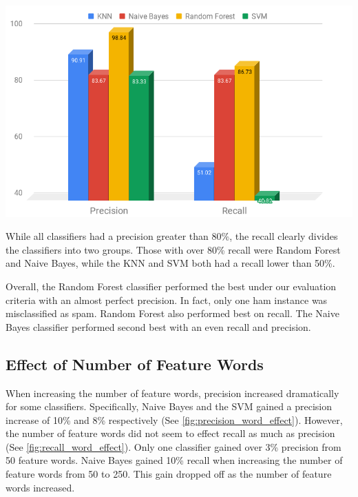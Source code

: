 \documentclass[12pt]{article}
\newenvironment{Figure}
  {\par\medskip\noindent\minipage{\linewidth}}
  {\endminipage\par\medskip}
\begin{document}
\begin{multicols}{2}
                \begin{Figure}
                    \centering
                    \includegraphics[width=\linewidth]{figures/precision_recall.png}
                    \label{fig:precision_recall}
                \end{Figure}

                While all classifiers had a precision greater than 80\%, the recall clearly divides the 
                classifiers into two groups. Those with over 80\% recall were Random Forest and Naive Bayes, 
                while the KNN and SVM both had a recall lower than 50\%. 
                
                Overall, the Random Forest classifier performed the best under our evaluation criteria 
                with an almost perfect precision. In fact, only one ham instance was misclassified as spam. 
                Random Forest also performed best on recall. The Naive Bayes classifier performed second best 
                with an even recall and precision.

            \subsection{Effect of Number of Feature Words} 
                When increasing the number of feature words, precision increased dramatically for some classifiers. 
                Specifically, Naive Bayes and the SVM gained a precision increase of 10\% and 8\% respectively (See \autoref{fig:precision_word_effect}).
                However, the number of feature words did not seem to effect recall as much as precision (See \autoref{fig:recall_word_effect}).
                Only one classifier gained over 3\% precision from 50 feature words. Naive Bayes gained 10\% recall when increasing 
                the number of feature words from 50 to 250. This gain dropped off as the number of feature words increased.


\end{multicols}
\end{document}
